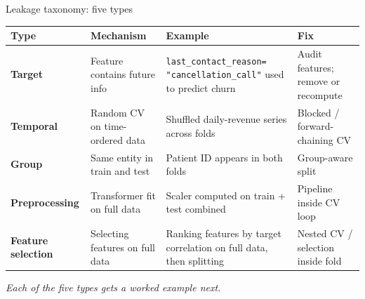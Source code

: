 \documentclass[10pt,compress,t,notes=noshow, xcolor=table]{beamer}
\begin{document}
\begin{frame}{Leakage taxonomy: five types}
\label{leakage-taxonomy}

\renewcommand{\arraystretch}{1.25}
\footnotesize
\begin{tabular}{|>{\raggedright\arraybackslash}p{2.1cm}|>{\raggedright\arraybackslash}p{2.6cm}|>{\raggedright\arraybackslash}p{3.9cm}|>{\raggedright\arraybackslash}p{2.6cm}|}
\hline
\rowcolor{gray!20}
\textbf{Type} & \textbf{Mechanism} & \textbf{Example} & \textbf{Fix} \\
\hline
\textbf{Target} & Feature contains future info & \texttt{last\_contact\_reason}\linebreak \texttt{= "cancellation\_call"} used to predict churn & Audit features; remove or recompute \\
\hline
\textbf{Temporal} & Random CV on time-ordered data & Shuffled daily-revenue series across folds & Blocked / forward-chaining CV \\
\hline
\textbf{Group} & Same entity in train and test & Patient ID appears in both folds & Group-aware split \\
\hline
\textbf{Preprocessing} & Transformer fit on full data & Scaler computed on train + test combined & Pipeline inside CV loop \\
\hline
\textbf{Feature selection} & Selecting features on full data & Ranking features by target correlation on full data, then splitting & Nested CV / selection inside fold \\
\hline
\end{tabular}

\medskip

\centering\footnotesize\itshape Each of the five types gets a worked example next.

\end{frame}
\end{document}
